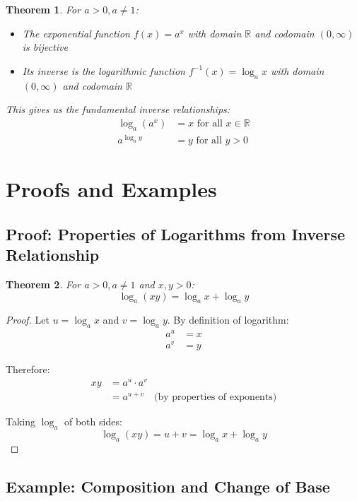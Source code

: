 \documentclass[12pt]{article}
\newtheorem{theorem}{Theorem}
\begin{document}
\begin{theorem}
For $a > 0, a \neq 1$:
\begin{itemize}
\item The exponential function $f(x) = a^x$ with domain $\mathbb{R}$ and codomain $(0,\infty)$ is bijective
\item Its inverse is the logarithmic function $f^{-1}(x) = \log_a x$ with domain $(0,\infty)$ and codomain $\mathbb{R}$
\end{itemize}

This gives us the fundamental inverse relationships:
\begin{align}
\log_a(a^x) &= x \text{ for all } x \in \mathbb{R} \\
a^{\log_a y} &= y \text{ for all } y > 0
\end{align}
\end{theorem}

\section{Proofs and Examples}

\subsection{Proof: Properties of Logarithms from Inverse Relationship}

\begin{theorem}
For $a > 0, a \neq 1$ and $x, y > 0$:
$$\log_a(xy) = \log_a x + \log_a y$$
\end{theorem}

\begin{proof}
Let $u = \log_a x$ and $v = \log_a y$. By definition of logarithm:
\begin{align}
a^u &= x \\
a^v &= y
\end{align}

Therefore:
\begin{align}
xy &= a^u \cdot a^v \\
&= a^{u+v} \quad \text{(by properties of exponents)}
\end{align}

Taking $\log_a$ of both sides:
$$\log_a(xy) = u + v = \log_a x + \log_a y$$
\end{proof}

\subsection{Example: Composition and Change of Base}
\end{document}
